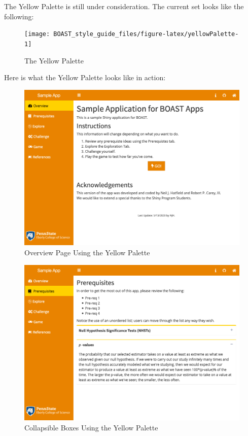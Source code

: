\documentclass[
]{book}
\begin{document}
The Yellow Palette is still under consideration. The current set looks like the following:

\begin{figure}

{\centering \texttt{[image: BOAST\_style\_guide\_files/figure-latex/yellowPalette-1]} 

}

\caption{The Yellow Palette}\label{fig:yellowPalette}
\end{figure}

Here is what the Yellow Palette looks like in action:

\begin{figure}

{\centering \includegraphics[width=14in]{images/colorThemes/yellowOverview} 

}

\caption{Overview Page Using the Yellow Palette}\label{fig:yellowAction1}
\end{figure}

\begin{figure}

{\centering \includegraphics[width=14in]{images/colorThemes/yellowCollapse} 

}

\caption{Collapsible Boxes Using the Yellow Palette}\label{fig:yellowAction2}
\end{figure}
\end{document}
